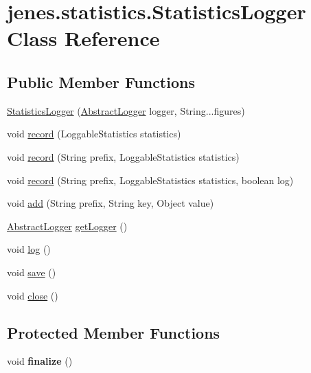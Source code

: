 \hypertarget{classjenes_1_1statistics_1_1_statistics_logger}{
\section{jenes.statistics.StatisticsLogger Class Reference}
\label{classjenes_1_1statistics_1_1_statistics_logger}
}
\subsection*{Public Member Functions}
\begin{CompactItemize}
\item 
\hyperlink{classjenes_1_1statistics_1_1_statistics_logger_d4bf879bdfb673a6f82f3536fd5557b8}{StatisticsLogger} (\hyperlink{classjenes_1_1utils_1_1_abstract_logger}{AbstractLogger} logger, String...figures)
\item 
void \hyperlink{classjenes_1_1statistics_1_1_statistics_logger_8f7fc89cbbd6c6aad447057cd3eb6dbe}{record} (LoggableStatistics statistics)
\item 
void \hyperlink{classjenes_1_1statistics_1_1_statistics_logger_31acd1617a14ed32519fc5487b30fd25}{record} (String prefix, LoggableStatistics statistics)
\item 
void \hyperlink{classjenes_1_1statistics_1_1_statistics_logger_1e68400e5e02df74005d654dd52a9b34}{record} (String prefix, LoggableStatistics statistics, boolean log)
\item 
void \hyperlink{classjenes_1_1statistics_1_1_statistics_logger_c9ee13346b299296f315ad6cf247fdcf}{add} (String prefix, String key, Object value)
\item 
\hyperlink{classjenes_1_1utils_1_1_abstract_logger}{AbstractLogger} \hyperlink{classjenes_1_1statistics_1_1_statistics_logger_bd8fdfad668108933aa315c415050d63}{getLogger} ()
\item 
void \hyperlink{classjenes_1_1statistics_1_1_statistics_logger_35539d6c4f5664617185d68c6efdf66a}{log} ()
\item 
void \hyperlink{classjenes_1_1statistics_1_1_statistics_logger_80cde2facc21c7398050e89131a7321e}{save} ()
\item 
void \hyperlink{classjenes_1_1statistics_1_1_statistics_logger_ae3d375349f86fcd9a7ce450bae3d046}{close} ()
\end{CompactItemize}
\subsection*{Protected Member Functions}
\begin{CompactItemize}
\item 
\hypertarget{classjenes_1_1statistics_1_1_statistics_logger_c1b95fdfa1e20c87b66d6f36b78d9ed1}{
void \textbf{finalize} ()}
\label{classjenes_1_1statistics_1_1_statistics_logger_c1b95fdfa1e20c87b66d6f36b78d9ed1}

\end{CompactItemize}
